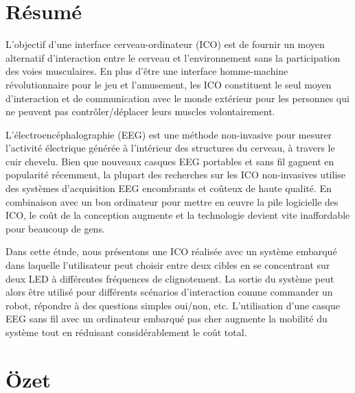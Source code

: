 \documentclass[12pt]{article}
\numberwithin{equation}{section}
\numberwithin{figure}{section}
\numberwithin{table}{section}
\begin{document}
\clearpage

\vspace*{-0.35cm}
\thispagestyle{empty}
\section*{R\'{e}sum\'{e}}
\vspace*{6pt}

\par{
    L'objectif d'une interface cerveau-ordinateur (ICO) est de fournir un moyen alternatif d'interaction
    entre le cerveau et l'environnement sans la participation des voies musculaires.
    En plus d'être une interface homme-machine révolutionnaire pour le jeu et l'amusement,
    les ICO constituent le seul moyen d'interaction et de communication avec le monde extérieur
    pour les personnes qui ne peuvent pas contrôler/déplacer leurs muscles volontairement.
}
\par{
    L'électroencéphalographie (EEG) est une méthode non-invasive pour mesurer l'activité électrique
    générée à l'intérieur des structures du cerveau, à travers le cuir chevelu. Bien que nouveaux casques
    EEG portables et sans fil gagnent en popularité récemment, la plupart des recherches
    sur les ICO non-invasives utilise des systèmes d'acquisition EEG encombrants et coûteux de haute qualité. En combinaison avec un
    bon ordinateur pour mettre en œuvre la pile logicielle des ICO, le coût de la conception
    augmente et la technologie devient vite inaffordable pour beaucoup de gens.
}
\par{
    Dans cette étude, nous présentons une ICO réalisée avec un système embarqué
    dans laquelle l'utilisateur peut choisir entre deux cibles en se concentrant sur deux LED
    à différentes fréquences de clignotement. La sortie du système peut alors être utilisé pour différents
    scénarios d'interaction comme commander un robot, répondre à des questions simples oui/non, etc.
    L'utilisation d'une casque EEG sans fil avec un ordinateur embarqué pas cher
    augmente la mobilité du système tout en réduisant considérablement le coût total.
}
\clearpage

\vspace*{-0.35cm}
\thispagestyle{empty}
\section*{\"{O}zet}
\vspace*{6pt}
\end{document}
